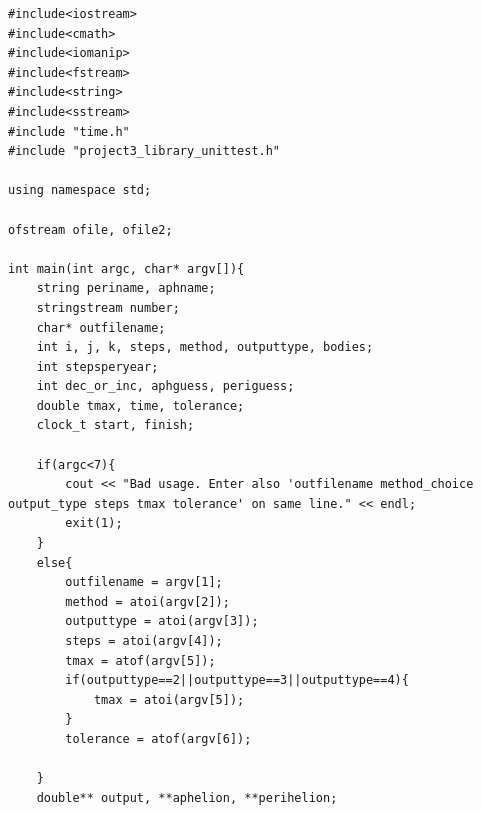 \documentclass[11pt,a4paper]{article}
\begin{document}
\begin{lstlisting}[title={project3-unittest.cpp}]
#include<iostream>
#include<cmath>
#include<iomanip>
#include<fstream>
#include<string>
#include<sstream>
#include "time.h"
#include "project3_library_unittest.h"

using namespace std;

ofstream ofile, ofile2;

int main(int argc, char* argv[]){
	string periname, aphname;
	stringstream number;
	char* outfilename;
	int i, j, k, steps, method, outputtype, bodies;
	int stepsperyear;
	int dec_or_inc, aphguess, periguess;
	double tmax, time, tolerance;
	clock_t start, finish;

	if(argc<7){
		cout << "Bad usage. Enter also 'outfilename method_choice output_type steps tmax tolerance' on same line." << endl;
		exit(1);
	}
	else{
		outfilename = argv[1];
		method = atoi(argv[2]);
		outputtype = atoi(argv[3]);
		steps = atoi(argv[4]);
		tmax = atof(argv[5]);
		if(outputtype==2||outputtype==3||outputtype==4){
			tmax = atoi(argv[5]);
		}
		tolerance = atof(argv[6]);
		
	}
	double** output, **aphelion, **perihelion;


\end{lstlisting}
\end{document}
